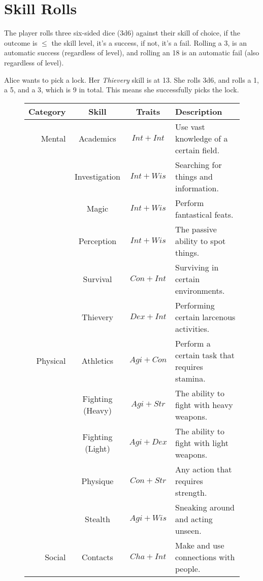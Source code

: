 \section{Skill Rolls}
The player rolls three six-sided dice (3d6) against their skill of choice, if the outcome is $\leq$ the skill level, it's a success, if not, it's a fail.
Rolling a 3, is an automatic success (regardless of level), and rolling an 18 is an automatic fail (also regardless of level).

\example Alice wants to pick a lock. 
Her \textit{Thievery} skill is at 13. 
She rolls 3d6, and rolls a 1, a 5, and a 3, which is 9 in total. 
This means she successfully picks the lock.

\begin{figure}
\centering
\begin{tabular}{r | c | c | l}
\textbf{Category} & \textbf{Skill}   & \textbf{Traits} & \textbf{Description} \\\hline
    Mental    & Academics        & $Int+Int$ & Use vast knowledge of a certain field.        \\
              & Investigation    & $Int+Wis$ & Searching for things and information.         \\
              & Magic            & $Int+Wis$ & Perform fantastical feats.                    \\
              & Perception       & $Int+Wis$ & The passive ability to spot things.           \\
              & Survival         & $Con+Int$ & Surviving in certain environments.            \\
              & Thievery         & $Dex+Int$ & Performing certain larcenous activities.      \\\hline
    Physical  & Athletics        & $Agi+Con$ & Perform a certain task that requires stamina. \\
              & Fighting (Heavy) & $Agi+Str$ & The ability to fight with heavy weapons.      \\
              & Fighting (Light) & $Agi+Dex$ & The ability to fight with light weapons.      \\
              & Physique         & $Con+Str$ & Any action that requires strength.            \\
              & Stealth          & $Agi+Wis$ & Sneaking around and acting unseen.            \\\hline
    Social    & Contacts         & $Cha+Int$ & Make and use connections with people.         \\

\end{tabular}
\end{figure}
